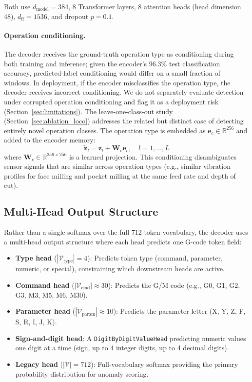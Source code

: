 Both use $d_{\text{model}} = 384$, 8 Transformer layers, 8 attention heads (head dimension 48), $d_{\text{ff}} = 1536$, and dropout $p = 0.1$.

\paragraph{Operation conditioning.}
The decoder receives the ground-truth operation type as conditioning during both training and inference; given the encoder's 96.3\% test classification accuracy, predicted-label conditioning would differ on a small fraction of windows.
In deployment, if the encoder misclassifies the operation type, the decoder receives incorrect conditioning.
We do not separately evaluate detection under corrupted operation conditioning and flag it as a deployment risk (Section~\ref{sec:limitations}).
The leave-one-class-out study (Section~\ref{sec:ablation_loco}) addresses the related but distinct case of detecting entirely novel operation classes.
The operation type is embedded as $\mathbf{e}_c \in \mathbb{R}^{256}$ and added to the encoder memory:
\begin{equation}
    \tilde{\mathbf{z}}_l = \mathbf{z}_l + \mathbf{W}_c \mathbf{e}_c, \quad l = 1, \ldots, L
    \label{eq:op_conditioning}
\end{equation}
where $\mathbf{W}_c \in \mathbb{R}^{256 \times 256}$ is a learned projection.
This conditioning disambiguates sensor signals that are similar across operation types (e.g., similar vibration profiles for face milling and pocket milling at the same feed rate and depth of cut).

\subsection{Multi-Head Output Structure}
\label{sec:multihead}

Rather than a single softmax over the full 712-token vocabulary, the decoder uses a multi-head output structure where each head predicts one G-code token field:

\begin{itemize}
    \item \textbf{Type head} ($|\mathcal{V}_{\text{type}}| = 4$): Predicts token type (command, parameter, numeric, or special), constraining which downstream heads are active.
    \item \textbf{Command head} ($|\mathcal{V}_{\text{cmd}}| \approx 30$): Predicts the G/M code (e.g., G0, G1, G2, G3, M3, M5, M6, M30).
    \item \textbf{Parameter head} ($|\mathcal{V}_{\text{param}}| \approx 10$): Predicts the parameter letter (X, Y, Z, F, S, R, I, J, K).
    \item \textbf{Sign-and-digit head}: A \texttt{DigitByDigitValueHead} predicting numeric values one digit at a time (sign, up to 4 integer digits, up to 4 decimal digits).
    \item \textbf{Legacy head} ($|\mathcal{V}| = 712$): Full-vocabulary softmax providing the primary probability distribution for anomaly scoring.
\end{itemize}

